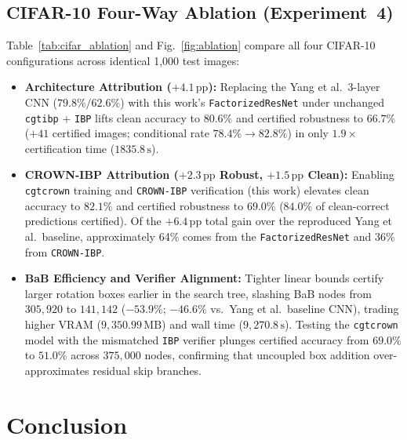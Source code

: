 \documentclass[conference]{IEEEtran}
\begin{document}
\subsection{CIFAR-10 Four-Way Ablation (Experiment~4)}
Table~\ref{tab:cifar_ablation} and Fig.~\ref{fig:ablation} compare all four
CIFAR-10 configurations across identical 1,000 test images:
\begin{itemize}
  \item \textbf{Architecture Attribution ($+4.1\,\text{pp}$):}
        Replacing the Yang et al.\ 3-layer CNN ($79.8\% / 62.6\%$) with
        this work's \texttt{FactorizedResNet} under unchanged
        \texttt{cgtibp} + \texttt{IBP} lifts clean accuracy to $80.6\%$
        and certified robustness to $66.7\%$
        ($+41$ certified images; conditional rate $78.4\% \to 82.8\%$)
        in only $1.9\times$ certification time ($1835.8\,\text{s}$).
  \item \textbf{CROWN-IBP Attribution ($+2.3\,\text{pp}$ Robust,
        $+1.5\,\text{pp}$ Clean):}
        Enabling \texttt{cgtcrown} training and \texttt{CROWN-IBP}
        verification (this work) elevates clean accuracy to $82.1\%$ and
        certified robustness to $69.0\%$ ($84.0\%$ of clean-correct
        predictions certified).
        Of the $+6.4\,\text{pp}$ total gain over the reproduced
        Yang et al.\ baseline, approximately 64\% comes from the
        \texttt{FactorizedResNet} and 36\% from \texttt{CROWN-IBP}.
  \item \textbf{BaB Efficiency and Verifier Alignment:}
        Tighter linear bounds certify larger rotation boxes earlier in the
        search tree, slashing BaB nodes from $305{,}920$ to $141{,}142$
        ($-53.9\%$; $-46.6\%$ vs.\ Yang et al.\ baseline CNN), trading
        higher VRAM ($9{,}350.99\,\text{MB}$) and wall time
        ($9{,}270.8\,\text{s}$).
        Testing the \texttt{cgtcrown} model with the mismatched \texttt{IBP}
        verifier plunges certified accuracy from $69.0\%$ to $51.0\%$
        across $375{,}000$ nodes, confirming that uncoupled box addition
        over-approximates residual skip branches.
\end{itemize}

\section{Conclusion}
\end{document}
